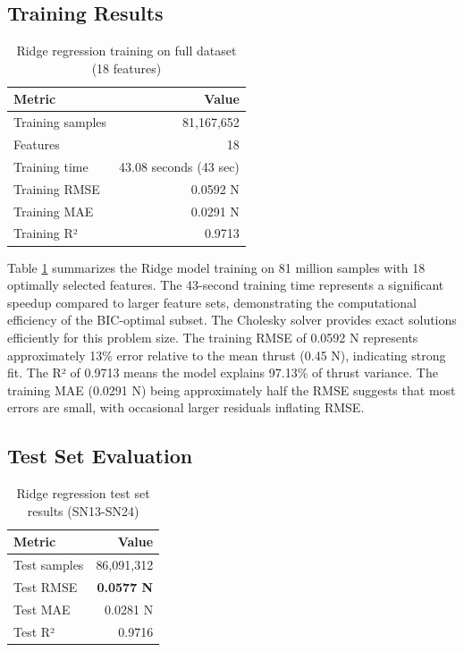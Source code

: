\documentclass[12pt,a4paper]{article}
\begin{document}
\subsection{Training Results}

\begin{table}[H]
\centering
\caption{Ridge regression training on full dataset (18 features)}
\label{tab:ridge_training}
\begin{tabular}{lr}
\toprule
\textbf{Metric} & \textbf{Value} \\
\midrule
Training samples & 81,167,652 \\
Features & 18 \\
Training time & 43.08 seconds (43 sec) \\
Training RMSE & 0.0592 N \\
Training MAE & 0.0291 N \\
Training R² & 0.9713 \\
\bottomrule
\end{tabular}
\end{table}

Table \ref{tab:ridge_training} summarizes the Ridge model training on 81 million samples with 18 optimally selected features. The 43-second training time represents a significant speedup compared to larger feature sets, demonstrating the computational efficiency of the BIC-optimal subset. The Cholesky solver provides exact solutions efficiently for this problem size. The training RMSE of 0.0592 N represents approximately 13\% error relative to the mean thrust (0.45 N), indicating strong fit. The R² of 0.9713 means the model explains 97.13\% of thrust variance. The training MAE (0.0291 N) being approximately half the RMSE suggests that most errors are small, with occasional larger residuals inflating RMSE.

\subsection{Test Set Evaluation}

\begin{table}[H]
\centering
\caption{Ridge regression test set results (SN13-SN24)}
\label{tab:ridge_test}
\begin{tabular}{lr}
\toprule
\textbf{Metric} & \textbf{Value} \\
\midrule
Test samples & 86,091,312 \\
Test RMSE & \textbf{0.0577 N} \\
Test MAE & 0.0281 N \\
Test R² & 0.9716 \\
\bottomrule
\end{tabular}
\end{table}
\end{document}
